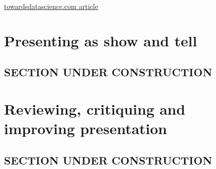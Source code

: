 \documentclass[
]{book}
\begin{document}
\href{https://towardsdatascience.com/why-is-this-chart-bad-5f16da298afa}{towardsdatascience.com article}

\hypertarget{show}{%
\chapter{Presenting as show and tell}\label{show}}

\hypertarget{section-under-construction-1}{%
\section{SECTION UNDER CONSTRUCTION}\label{section-under-construction-1}}

\hypertarget{review}{%
\chapter{Reviewing, critiquing and improving presentation}\label{review}}

\hypertarget{section-under-construction-2}{%
\section{SECTION UNDER CONSTRUCTION}\label{section-under-construction-2}}

  
\end{document}
